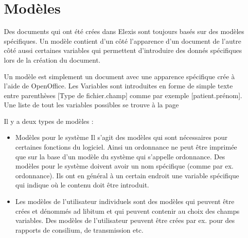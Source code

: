 

 \section{Modèles}
 \label{textvorlagen}
Des documents qui ont été crées dans Elexis sont toujours basés sur des modèles spécifiques. Un modèle contient d'un côté l'apparence d'un document de l'autre côté aussi certaines variables qui permettent d'introduire des donnés spécifiques lors de la création du document.

Un modèle est simplement un document avec une apparence spécifique crée à l'aide de OpenOffice. Les Variables sont introduites en forme de simple texte entre parenthèses [Type de fichier.champ] comme par exemple [patient.prénom]. Une liste de tout les variables possibles se trouve à la page \pageref{Platzhalter}

Il y a deux types de modèles :
\begin{itemize}
  \item {Modèles pour le système } Il s'agit des modèles qui sont nécessaires pour certaines fonctions du logiciel. Ainsi un ordonnance ne peut être imprimée que sur la base d'un modèle du système qui s'appelle \glqq ordonnance\grqq{}. Des modèles pour le système doivent avoir un nom spécifique (comme par ex.  \glqq ordonnance\grqq{}). Ils ont en général à un certain endroit une variable spécifique qui indique où le contenu doit être introduit.
  \item {Les modèles de l'utilisateur individuels } sont des modèles qui peuvent être crées et dénommés ad libitum et qui peuvent contenir au choix des champs variables. Des modèles de l'utilisateur peuvent être crées par ex. pour des rapports de consilium, de transmission etc.
\end{itemize}


